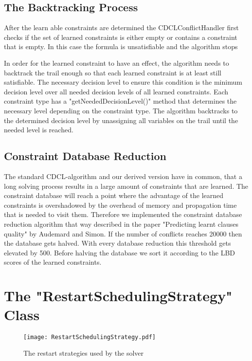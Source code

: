 \subsection{The Backtracking Process}

After the learn able constraints are determined the CDCLConflictHandler first checks if the set of learned constraints is either empty or contains a constraint that is empty. In this case the formula is unsatisfiable and the algorithm stops
\par
In order for the learned constraint to have an effect, the algorithm needs to backtrack the trail enough so that each learned constraint is at least still satisfiable. The necessary decision level to ensure this condition is the minimum decision level over all needed decision levels of all learned constraints. Each constraint type has a "getNeededDecisionLevel()" method that determines the necessary level depending on the constraint type. The algorithm backtracks to the determined decision level by unassigning all variables on the trail until the needed level is reached.

\subsection{Constraint Database Reduction}

The standard CDCL-algorithm and our derived version have in common, that a long solving process results in a large amount of constraints that are learned. The constraint database will reach a point where the advantage of the learned constraints is overshadowed by the overhead of memory and propagation time that is needed to visit them. Therefore we implemented the constraint database reduction algorithm that way described in the paper "Predicting learnt clauses quality" \cite{audemard2009predicting} by Audemard and Simon. If the number of conflicts reaches 20000 then the database gets halved. With every database reduction this threshold gets elevated by 500. Before halving the database we sort it according to the LBD scores of the learned constraints.

\section{The "RestartSchedulingStrategy" Class}

\begin{figure}[htbp]
  \centering
  \texttt{[image: RestartSchedulingStrategy.pdf]}	
  \caption{The restart strategies used by the solver}
  \label{fig:restartScheduling}
\end{figure}


